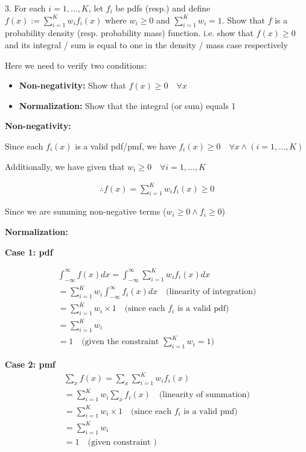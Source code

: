 \documentclass[10pt]{article}
\begin{document}
3. For each $i = 1, …, K$, let $f_i$ be pdfs (resp.) and define $f(x) := \sum_{i = 1}^{K}w_if_i(x)$ where $w_i \geq 0$ and 
$\sum_{i = 1}^{K}w_i = 1$. Show that $f$ is a probability density (resp. probability mass) function. i.e. show that $f(x) \geq 0$ and its integral / sum is equal to one in the density / mass case respectively

Here we need to verify two conditions: 
\begin{itemize}
    \item \textbf{Non-negativity:} Show that $f(x) \geq 0\quad\forall x$
    \item \textbf{Normalization:} Show that the integral (or sum) equals 1
\end{itemize}

\textbf{Non-negativity:}

Since each $f_i(x)$ is a valid pdf/pmf, we have $f_i(x) \geq 0 \quad\forall x \land (i = 1, …, K)$

Additionally, we have given that $w_i \geq 0 \quad\forall i = 1, …, K$

\begin{align*}
    \therefore f(x) = \sum_{i = 1}^{K} w_i f_i(x) \geq 0
\end{align*}

Since we are summing non-negative terms ($w_i \geq 0 \land f_i \geq 0$)

\hfill

\textbf{Normalization:}

\textbf{Case 1: pdf}

\begin{align*}
    \int_{-\infty}^{\infty} f(x) dx = \int_{-\infty}^{\infty} \sum_{i = 1}^{K} w_i f_i(x) dx \\
    = \sum_{i = 1}^{K} w_i \int_{-\infty}^{\infty} f_i(x) dx \quad\text{(linearity of integration)}\\
    = \sum_{i = 1}^{K} w_i \times 1 \quad\text{(since each $f_i$ is a valid pdf)} \\
    = \sum_{i = 1}^{K} w_i \\
    = 1 \quad\text{(given the constraint $\sum_{i = 1}^{K}w_i = 1$)}
\end{align*}

\textbf{Case 2: pmf}
\begin{align*}
    \sum_{x} f(x) = \sum_x \sum_{i = 1}^{K} w_i f_i(x) \\
    = \sum_{i = 1}^{K} w_i \sum_x f_i(x) \quad\text{(linearity of summation)}\\
    = \sum_{i = 1}^{K} w_i \times 1 \quad\text{(since each $f_i$ is a valid pmf)}\\
    = \sum_{i = 1}^{K} w_i\\
    = 1 \quad\text{(given constraint )}
\end{align*}
\end{document}
